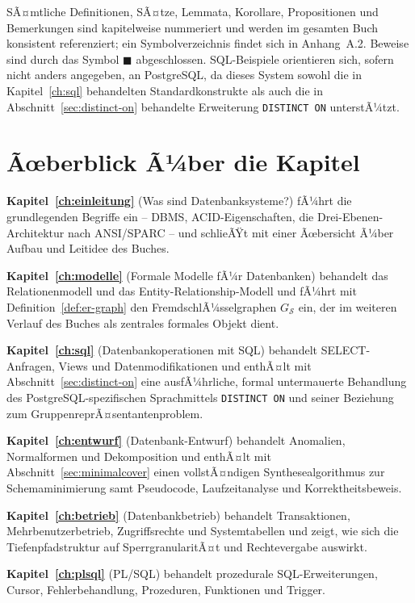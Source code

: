 ﻿\documentclass[a4paper,12pt]{report}
\theoremstyle{definition}
\theoremstyle{remark}
\begin{document}
SÃ¤mtliche Definitionen, SÃ¤tze, Lemmata, Korollare, Propositionen und
Bemerkungen sind kapitelweise nummeriert und werden im gesamten Buch
konsistent referenziert; ein Symbolverzeichnis findet sich in
Anhang~A.2. Beweise sind durch das Symbol $\blacksquare$
abgeschlossen. SQL-Beispiele orientieren sich, sofern nicht anders
angegeben, an PostgreSQL, da dieses System sowohl die in
Kapitel~\ref{ch:sql} behandelten Standardkonstrukte als auch die in
Abschnitt~\ref{sec:distinct-on} behandelte Erweiterung
\texttt{DISTINCT ON} unterstÃ¼tzt.

\section*{Ãœberblick Ã¼ber die Kapitel}

\textbf{Kapitel~\ref{ch:einleitung}} (\glqq Was sind
Datenbanksysteme?\grqq{}) fÃ¼hrt die grundlegenden Begriffe ein --
DBMS, ACID-Eigenschaften, die Drei-Ebenen-Architektur nach
ANSI/SPARC -- und schlieÃŸt mit einer Ãœbersicht Ã¼ber Aufbau und
Leitidee des Buches.

\textbf{Kapitel~\ref{ch:modelle}} (\glqq Formale Modelle fÃ¼r
Datenbanken\grqq{}) behandelt das Relationenmodell und das
Entity-Relationship-Modell und fÃ¼hrt mit
Definition~\ref{def:er-graph} den FremdschlÃ¼sselgraphen
$G_{\mathcal{S}}$ ein, der im weiteren Verlauf des Buches als
zentrales formales Objekt dient.

\textbf{Kapitel~\ref{ch:sql}} (\glqq Datenbankoperationen mit
SQL\grqq{}) behandelt SELECT-Anfragen, Views und
Datenmodifikationen und enthÃ¤lt mit
Abschnitt~\ref{sec:distinct-on} eine ausfÃ¼hrliche, formal untermauerte
Behandlung des PostgreSQL-spezifischen Sprachmittels
\texttt{DISTINCT ON} und seiner Beziehung zum
GruppenreprÃ¤sentantenproblem.

\textbf{Kapitel~\ref{ch:entwurf}} (\glqq Datenbank-Entwurf\grqq{})
behandelt Anomalien, Normalformen und Dekomposition und enthÃ¤lt mit
Abschnitt~\ref{sec:minimalcover} einen vollstÃ¤ndigen
Synthesealgorithmus zur Schemaminimierung samt Pseudocode,
Laufzeitanalyse und Korrektheitsbeweis.

\textbf{Kapitel~\ref{ch:betrieb}} (\glqq Datenbankbetrieb\grqq{})
behandelt Transaktionen, Mehrbenutzerbetrieb, Zugriffsrechte und
Systemtabellen und zeigt, wie sich die Tiefenpfadstruktur auf
SperrgranularitÃ¤t und Rechtevergabe auswirkt.

\textbf{Kapitel~\ref{ch:plsql}} (\glqq PL/SQL\grqq{}) behandelt
prozedurale SQL-Erweiterungen, Cursor, Fehlerbehandlung, Prozeduren,
Funktionen und Trigger.
\end{document}

